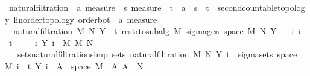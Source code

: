 \begin{isabellebody}
\ natural{\isacharunderscore}{\kern0pt}filtration\ {\isacharcolon}{\kern0pt}{\isacharcolon}{\kern0pt}\ {\isachardoublequoteopen}{\isacharprime}{\kern0pt}a\ measure\ {\isasymRightarrow}\ {\isacharprime}{\kern0pt}s\ measure\ {\isasymRightarrow}\ {\isacharparenleft}{\kern0pt}{\isacharprime}{\kern0pt}t\ {\isasymRightarrow}\ {\isacharprime}{\kern0pt}a\ {\isasymRightarrow}\ {\isacharprime}{\kern0pt}s{\isacharparenright}{\kern0pt}\ {\isasymRightarrow}\ {\isacharprime}{\kern0pt}t\ {\isacharcolon}{\kern0pt}{\isacharcolon}{\kern0pt}\ {\isacharbraceleft}{\kern0pt}second{\isacharunderscore}{\kern0pt}countable{\isacharunderscore}{\kern0pt}topology{\isacharcomma}{\kern0pt}\ linorder{\isacharunderscore}{\kern0pt}topology{\isacharcomma}{\kern0pt}\ order{\isacharunderscore}{\kern0pt}bot{\isacharbraceright}{\kern0pt}\ {\isasymRightarrow}\ {\isacharprime}{\kern0pt}a\ measure{\isachardoublequoteclose}\ \isanewline
\ \ {\isachardoublequoteopen}natural{\isacharunderscore}{\kern0pt}filtration\ M\ N\ Y\ {\isacharequal}{\kern0pt}\ {\isacharparenleft}{\kern0pt}{\isasymlambda}t{\isachardot}{\kern0pt}\ restr{\isacharunderscore}{\kern0pt}to{\isacharunderscore}{\kern0pt}subalg\ M\ {\isacharparenleft}{\kern0pt}sigma{\isacharunderscore}{\kern0pt}gen\ {\isacharparenleft}{\kern0pt}space\ M{\isacharparenright}{\kern0pt}\ N\ {\isacharbraceleft}{\kern0pt}Y\ i\ {\isacharbar}{\kern0pt}\ i{\isachardot}{\kern0pt}\ i\ {\isasymle}\ t{\isacharbraceright}{\kern0pt}{\isacharparenright}{\kern0pt}{\isacharparenright}{\kern0pt}{\isachardoublequoteclose}\isanewline
\isanewline
{}\isamarkupfalse%
\ \isanewline
\ \ \ {\isachardoublequoteopen}{\isasymAnd}i{\isachardot}{\kern0pt}\ Y\ i\ {\isasymin}\ M\ {\isasymrightarrow}\isactrlsub M\ N{\isachardoublequoteclose}\isanewline
\ \ \ sets{\isacharunderscore}{\kern0pt}natural{\isacharunderscore}{\kern0pt}filtration{\isacharbrackleft}{\kern0pt}simp{\isacharbrackright}{\kern0pt}{\isacharcolon}{\kern0pt}\ {\isachardoublequoteopen}sets\ {\isacharparenleft}{\kern0pt}natural{\isacharunderscore}{\kern0pt}filtration\ M\ N\ Y\ t{\isacharparenright}{\kern0pt}\ {\isacharequal}{\kern0pt}\ sigma{\isacharunderscore}{\kern0pt}sets\ {\isacharparenleft}{\kern0pt}space\ M{\isacharparenright}{\kern0pt}\ {\isacharparenleft}{\kern0pt}{\isasymUnion}i\ {\isasymle}\ t{\isachardot}{\kern0pt}\ {\isacharbraceleft}{\kern0pt}Y\ i\ {\isacharminus}{\kern0pt}{\isacharbackquote}{\kern0pt}\ A\ {\isasyminter}\ space\ M\ {\isacharbar}{\kern0pt}\ A{\isachardot}{\kern0pt}\ A\ {\isasymin}\ N{\isacharbraceright}{\kern0pt}{\isacharparenright}{\kern0pt}{\isachardoublequoteclose}\ \isanewline

\end{isabellebody}
